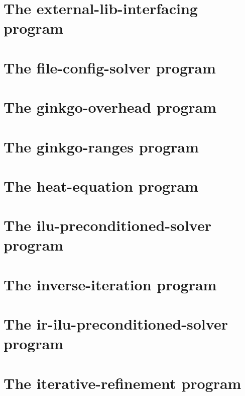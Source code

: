 \let\mypdfximage\pdfximage\def\pdfximage{\immediate\mypdfximage}\documentclass[twoside]{book}
\newcommand{\+}{\discretionary{\mbox{\scriptsize$\hookleftarrow$}}{}{}}
\begin{document}
\chapter{The external-\/lib-\/interfacing program}
\label{external_lib_interfacing}

\chapter{The file-\/config-\/solver program}
\label{file_config_solver}

\chapter{The ginkgo-\/overhead program}
\label{ginkgo_overhead}

\chapter{The ginkgo-\/ranges program}
\label{ginkgo_ranges}

\chapter{The heat-\/equation program}
\label{heat_equation}

\chapter{The ilu-\/preconditioned-\/solver program}
\label{ilu_preconditioned_solver}

\chapter{The inverse-\/iteration program}
\label{inverse_iteration}

\chapter{The ir-\/ilu-\/preconditioned-\/solver program}
\label{ir_ilu_preconditioned_solver}

\chapter{The iterative-\/refinement program}
\label{iterative_refinement}

\end{document}
